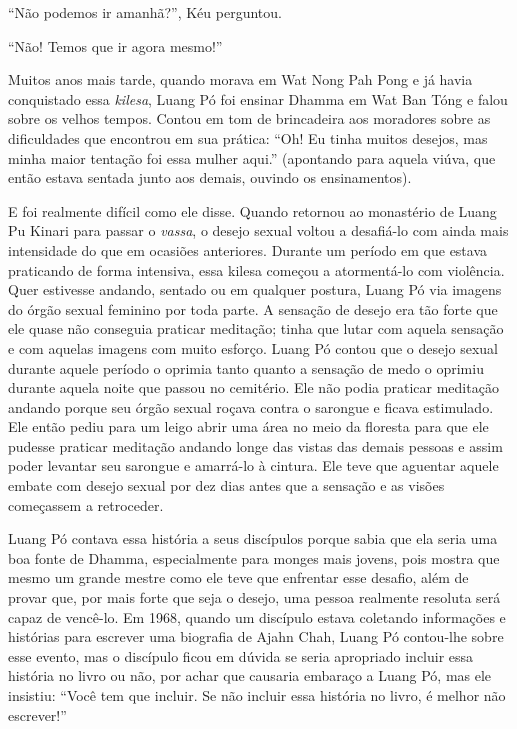 ``Não podemos ir amanhã?'', Kéu perguntou.

``Não! Temos que ir agora mesmo!''

Muitos anos mais tarde, quando morava em Wat Nong Pah Pong e já havia
conquistado essa \emph{kilesa}, Luang Pó foi ensinar Dhamma em Wat Ban
Tóng e falou sobre os velhos tempos. Contou em tom de brincadeira aos
moradores sobre as dificuldades que encontrou em sua prática: ``Oh! Eu
tinha muitos desejos, mas minha maior tentação foi essa mulher aqui.''
(apontando para aquela viúva, que então estava sentada junto aos demais,
ouvindo os ensinamentos).

E foi realmente difícil como ele disse. Quando retornou ao monastério de
Luang Pu Kinari para passar o \emph{vassa}, o desejo sexual voltou a
desafiá-lo com ainda mais intensidade do que em ocasiões anteriores.
Durante um período em que estava praticando de forma intensiva, essa
kilesa começou a atormentá-lo com violência. Quer estivesse andando,
sentado ou em qualquer postura, Luang Pó via imagens do órgão sexual
feminino por toda parte. A sensação de desejo era tão forte que ele
quase não conseguia praticar meditação; tinha que lutar com aquela
sensação e com aquelas imagens com muito esforço. Luang Pó contou que o
desejo sexual durante aquele período o oprimia tanto quanto a sensação
de medo o oprimiu durante aquela noite que passou no cemitério. Ele não
podia praticar meditação andando porque seu órgão sexual roçava contra o
sarongue e ficava estimulado. Ele então pediu para um leigo abrir uma
área no meio da floresta para que ele pudesse praticar meditação andando
longe das vistas das demais pessoas e assim poder levantar seu sarongue
e amarrá-lo à cintura. Ele teve que aguentar aquele embate com desejo
sexual por dez dias antes que a sensação e as visões começassem a
retroceder.

Luang Pó contava essa história a seus discípulos porque sabia que ela
seria uma boa fonte de Dhamma, especialmente para monges mais jovens,
pois mostra que mesmo um grande mestre como ele teve que enfrentar esse
desafio, além de provar que, por mais forte que seja o desejo, uma
pessoa realmente resoluta será capaz de \mbox{vencê-lo}. Em 1968, quando um
discípulo estava coletando informações e histórias para escrever uma
biografia de Ajahn Chah, Luang Pó contou-lhe sobre esse evento, mas o
discípulo ficou em dúvida se seria apropriado incluir essa história no
livro ou não, por achar que causaria embaraço a Luang Pó, mas ele
insistiu: ``Você tem que incluir. Se não incluir essa história no livro,
é melhor não escrever!''

